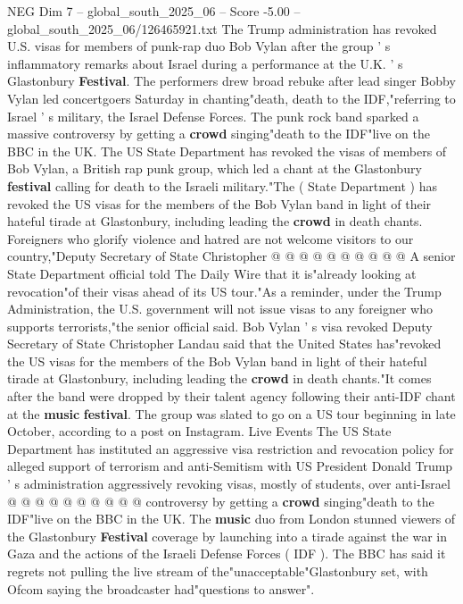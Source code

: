 \begin{textsample}{NEG Dim 7 – global\_south\_2025\_06 – Score -5.00 – global\_south\_2025\_06/126465921.txt}  \label{ex:f7_neg_279}
The Trump administration has revoked U.S. visas for members of punk-rap duo Bob Vylan after the group ' s inflammatory remarks about Israel during a performance at the U.K. ' s Glastonbury \textbf{Festival}.
The performers drew broad rebuke after lead singer Bobby Vylan led concertgoers Saturday in chanting"death, death to the IDF,"referring to Israel ' s military, the Israel Defense Forces.
The punk rock band sparked a massive controversy by getting a \textbf{crowd} singing"death to the IDF"live on the BBC in the UK.
The US State Department has revoked the visas of members of Bob Vylan, a British rap punk group, which led a chant at the Glastonbury \textbf{festival} calling for death to the Israeli military."The ( State Department ) has revoked the US visas for the members of the Bob Vylan band in light of their hateful tirade at Glastonbury, including leading the \textbf{crowd} in death chants.
Foreigners who glorify violence and hatred are not welcome visitors to our country,"Deputy Secretary of State Christopher @ @ @ @ @ @ @ @ @ @ A senior State Department official told The Daily Wire that it is"already looking at revocation"of their visas ahead of its US tour."As a reminder, under the Trump Administration, the U.S. government will not issue visas to any foreigner who supports terrorists,"the senior official said.
Bob Vylan ' s visa revoked Deputy Secretary of State Christopher Landau said that the United States has"revoked the US visas for the members of the Bob Vylan band in light of their hateful tirade at Glastonbury, including leading the \textbf{crowd} in death chants."It comes after the band were dropped by their talent agency following their anti-IDF chant at the \textbf{music} \textbf{festival}.
The group was slated to go on a US tour beginning in late October, according to a post on Instagram.
Live Events The US State Department has instituted an aggressive visa restriction and revocation policy for alleged support of terrorism and anti-Semitism with US President Donald Trump ' s administration aggressively revoking visas, mostly of students, over anti-Israel @ @ @ @ @ @ @ @ @ @ controversy by getting a \textbf{crowd} singing"death to the IDF"live on the BBC in the UK.
The \textbf{music} duo from London stunned viewers of the Glastonbury \textbf{Festival} coverage by launching into a tirade against the war in Gaza and the actions of the Israeli Defense Forces ( IDF ).
The BBC has said it regrets not pulling the live stream of the"unacceptable"Glastonbury set, with Ofcom saying the broadcaster had"questions to answer".

\end{textsample}
